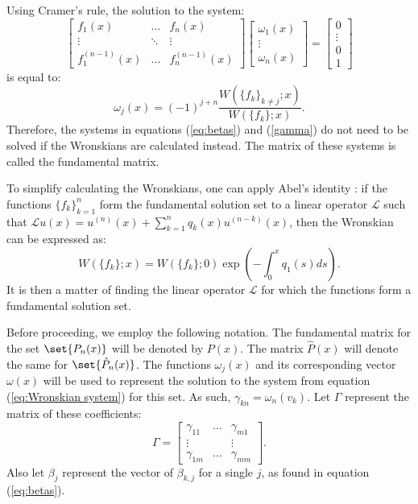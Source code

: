 \documentclass{article}
\begin{document}
Using Cramer's rule, the solution to the system:
\begin{equation} \label{eq:Wronskian system}
\begin{bmatrix} f_1(x) & \dots & f_n(x) \\ \vdots & \ddots & \vdots \\ f^{(n-1)}_1(x) & \dots & f_n^{(n-1)}(x) \end{bmatrix} 
\begin{bmatrix} \omega_1(x) \\ \vdots \\ \omega_n(x) \end{bmatrix} =
\begin{bmatrix} 0 \\ \vdots \\ 0 \\ 1 \end{bmatrix}
\end{equation}
is equal to:
\begin{equation} \label{eq:Wronskian coeffs}
\omega_j(x) = (-1)^{j+n} \frac{ W( \{ f_k \}_{k \neq j} ; x) }{ W( \{ f_k \} ; x ) } .
\end{equation}
Therefore, the systems in equations (\ref{eq:betas}) and (\ref{gamma}) do not need to be solved if the Wronskians are calculated instead.
The matrix of these systems is called the fundamental matrix.


To simplify calculating the Wronskians, one can apply Abel's identity \cite{Abel, BoyceDiPrima}:
if the functions $\{ f_k \}_{k=1}^n$ form the fundamental solution set to a linear operator $\mathcal{L}$ such that 
$\mathcal{L} u(x) = u^{(n)}(x) + \sum_{k=1}^n q_k(x) u^{(n - k)}(x)$, then the Wronskian can be expressed as:
\begin{equation}
W(\{f_k\}; x) = W(\{f_k\}; 0) \exp \left ({ - \int_{0}^x q_1(s) ds } \right ).
\end{equation}
It is then a matter of finding the linear operator $\mathcal{L}$ for which the functions form a fundamental solution set.

Before proceeding, we employ the following notation.
The fundamental matrix for the set $\set{P_n(x)}$ will be denoted by $P(x)$.
The matrix $\hat{P}(x)$ will denote the same for $\set{\hat{P}_n(x)}$.
The functions $\omega_j(x)$ and its corresponding vector $\omega(x)$ will be used to represent the solution to the system from equation (\ref{eq:Wronskian system}) for this set.
As such, $\gamma_{kn} = \omega_n(v_k)$.
Let $\Gamma$ represent the matrix of these coefficients:
\begin{equation*}
\Gamma = \begin{bmatrix} \gamma_{11} & \dots & \gamma_{m1} \\ \vdots & & \vdots \\ \gamma_{1m} & \dots & \gamma_{mm} \end{bmatrix} .
\end{equation*}
Also let $\beta_j$ represent the vector of $\beta_{k,j}$ for a single $j$, as found in equation (\ref{eq:betas}).
\end{document}
